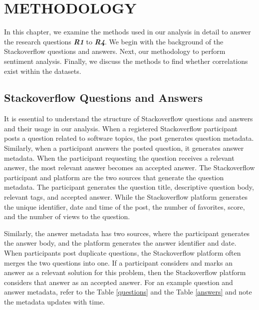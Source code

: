 \def\L{\textless}
\def\G{\textgreater}
\chapter{METHODOLOGY}

In this chapter, we examine the methods used in our analysis in detail to answer the research questions \emph{\textbf{R1}} to \emph{\textbf{R4}}. We begin with the background of the Stackoverflow questions and answers. Next, our methodology to perform sentiment analysis. Finally, we discuss the methods to find whether correlations exist within the datasets.

\section{Stackoverflow Questions and Answers}
It is essential to understand the structure of Stackoverflow questions and answers and their usage in our analysis. When a registered Stackoverflow participant posts a question related to software topics, the post generates question metadata. Similarly, when a participant answers the posted question, it generates answer metadata. When the participant requesting the question receives a relevant answer, the most relevant answer becomes an accepted answer. The Stackoverflow participant and platform are the two sources that generate the question metadata. The participant generates the question title, descriptive question body, relevant tags, and accepted answer. While the Stackoverflow platform generates the unique identifier, date and time of the post, the number of favorites, score, and the number of views to the question. 

Similarly, the answer metadata has two sources, where the participant generates the answer body, and the platform generates the answer identifier and date. When participants post duplicate questions, the Stackoverflow platform often merges the two questions into one. If a participant considers and marks an answer as a relevant solution for this problem, then the Stackoverflow platform considers that answer as an accepted answer. For an example question and answer metadata, refer to the Table \ref{questions} and the Table \ref{answers} and note the metadata updates with time.

